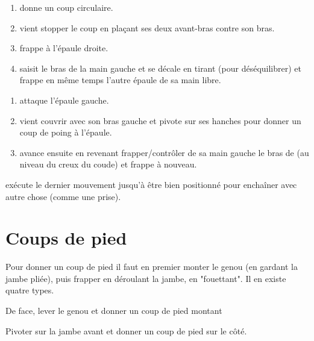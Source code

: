 \begin{exercice}

	\begin{enumerate}
		\item \A donne un coup circulaire.
		
		\item \D vient stopper le coup en plaçant ses deux avant-bras contre son bras.
		
		\item \D frappe à l'épaule droite.
		
		\item \D saisit le bras de la main gauche et se décale en tirant (pour déséquilibrer) et frappe en même temps l'autre épaule de sa main libre.
	\end{enumerate}
\end{exercice}


\begin{technique}
	\begin{enumerate}
		\item \A attaque l'épaule gauche.
		
		\item \D vient couvrir avec son bras gauche et pivote sur ses hanches pour donner un coup de poing à l'épaule.
		
		\item \D avance ensuite en revenant frapper/contrôler de sa main gauche le bras de \A (au niveau du creux du coude) et frappe à nouveau.
	\end{enumerate}

	\D exécute le dernier mouvement jusqu'à être bien positionné pour enchaîner avec autre chose (comme une prise).
\end{technique}



\section{Coups de pied}


Pour donner un coup de pied il faut en premier monter le genou (en gardant la jambe pliée), puis frapper en déroulant la jambe, en "fouettant".
Il en existe quatre types.


\begin{coup}
	De face, lever le genou et donner un coup de pied montant
\end{coup}


\begin{coup}
	Pivoter sur la jambe avant et donner un coup de pied sur le côté.
\end{coup}


